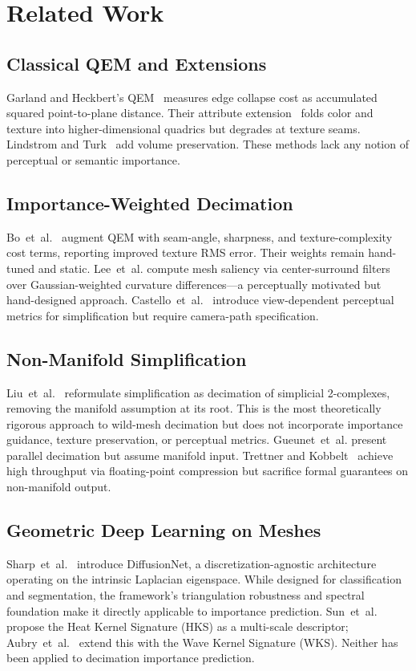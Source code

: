 \documentclass[10pt, twocolumn, a4paper]{article}
\begin{document}
\section{Related Work}
\label{sec:related}

\subsection{Classical QEM and Extensions}
Garland and Heckbert's QEM~\cite{garland1997surface} measures edge
collapse cost as accumulated squared point-to-plane distance. Their
attribute extension~\cite{garland1998simplifying} folds color and
texture into higher-dimensional quadrics but degrades at texture
seams. Lindstrom and Turk~\cite{lindstrom1998fast} add volume
preservation. These methods lack any notion of perceptual or
semantic importance.

\subsection{Importance-Weighted Decimation}
Bo~et~al.~\cite{bo2026detail} augment QEM with seam-angle, sharpness,
and texture-complexity cost terms, reporting improved texture RMS
error. Their weights remain hand-tuned and static. Lee~et~al.
\cite{lee2005mesh} compute mesh saliency via center-surround filters
over Gaussian-weighted curvature differences---a perceptually motivated
but hand-designed approach. Castello~et~al.~\cite{castello2008perceptual}
introduce view-dependent perceptual metrics for simplification but
require camera-path specification.

\subsection{Non-Manifold Simplification}
Liu~et~al.~\cite{liu2025simplifying} reformulate simplification as
decimation of simplicial 2-complexes, removing the manifold assumption
at its root. This is the most theoretically rigorous approach to
wild-mesh decimation but does not incorporate importance guidance,
texture preservation, or perceptual metrics. Gueunet~et~al.
\cite{gueunet2019parallel} present parallel decimation but assume
manifold input. Trettner and Kobbelt~\cite{trettner2020fast} achieve
high throughput via floating-point compression but sacrifice formal
guarantees on non-manifold output.

\subsection{Geometric Deep Learning on Meshes}
Sharp~et~al.~\cite{sharp2022diffusionnet} introduce DiffusionNet, a
discretization-agnostic architecture operating on the intrinsic
Laplacian eigenspace. While designed for classification and
segmentation, the framework's triangulation robustness and spectral
foundation make it directly applicable to importance prediction.
Sun~et~al.~\cite{sun2009concise} propose the Heat Kernel Signature
(HKS) as a multi-scale descriptor; Aubry~et~al.~\cite{aubry2011wave}
extend this with the Wave Kernel Signature (WKS). Neither has been
applied to decimation importance prediction.
\end{document}
